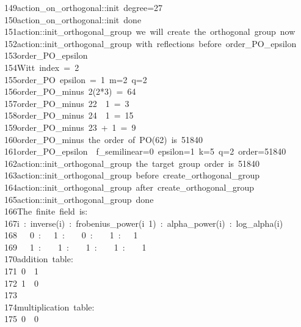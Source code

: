 \begin{tabbing}
149\>action\_on\_orthogonal::init\ degree=27\\[0pt]
150\>action\_on\_orthogonal::init\ done\\[0pt]
151\>action::init\_orthogonal\_group\ we\ will\ create\ the\ orthogonal\ group\ now\\[0pt]
152\>action::init\_orthogonal\_group\ with\ reflections\ before\ order\_PO\_epsilon\\[0pt]
153\>order\_PO\_epsilon\\[0pt]
154\>Witt\ index\ =\ 2\\[0pt]
155\>order\_PO\ epsilon\ =\ 1\ m=2\ q=2\\[0pt]
156\>order\_PO\_minus\ 2(2*3)\ =\ 64\\[0pt]
157\>order\_PO\_minus\ 22\ \ 1\ =\ 3\\[0pt]
158\>order\_PO\_minus\ 24\ \ 1\ =\ 15\\[0pt]
159\>order\_PO\_minus\ 23\ +\ 1\ =\ 9\\[0pt]
160\>order\_PO\_minus\ the\ order\ of\ PO(62)\ is\ 51840\\[0pt]
161\>order\_PO\_epsilon\ \ f\_semilinear=0\ epsilon=1\ k=5\ q=2\ order=51840\\[0pt]
162\>action::init\_orthogonal\_group\ the\ target\ group\ order\ is\ 51840\\[0pt]
163\>action::init\_orthogonal\_group\ before\ create\_orthogonal\_group\\[0pt]
164\>action::init\_orthogonal\_group\ after\ create\_orthogonal\_group\\[0pt]
165\>action::init\_orthogonal\_group\ done\\[0pt]
166\>The\ finite\ field\ is:\\[0pt]
167\>i\ :\ inverse(i)\ :\ frobenius\_power(i\ 1)\ :\ alpha\_power(i)\ :\ log\_alpha(i)\\[0pt]
168\>\ \ \ 0\ :\ \ \ 1\ :\ \ \ \ 0\ :\ \ \ \ 1\ :\ \ \ 1\\[0pt]
169\>\ \ \ 1\ :\ \ \ \ 1\ :\ \ \ \ 1\ :\ \ \ \ 1\ :\ \ \ \ 1\\[0pt]
170\>addition\ table:\\[0pt]
171\>\ 0\ \ 1\ \\[0pt]
172\>\ 1\ \ 0\ \\[0pt]
173\>\\[0pt]
174\>multiplication\ table:\\[0pt]
175\>\ 0\ \ 0\ \\[0pt]

\end{tabbing}
